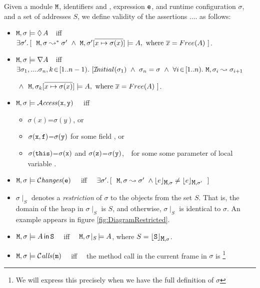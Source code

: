 \documentclass[acmsmall,screen]{acmart}
\begin{document}
\begin{definition}
\label{def:permission}
Given a module ${\mbox{\tt{M}}}$, identifiers  and , expression ${{\mbox{\tt{e}}}}$, and runtime configuration $\sigma$, and a set of addresses $S$,
we define validity of the assertions   .... as follows:

\begin{itemize}
\item
${{\mbox{\tt{M}}}{{{\mbox{\tt{}}}}}},\sigma \models  \lozenge\, A$\ \ iff\ \  $\exists \sigma'.\, [\ \ \M,\sigma \leadsto^* \sigma' \ \wedge \ \M,\sigma' [\overline{x \mapsto \sigma(x)}]\models \A, \mbox{ where } \overline{x}=Free(\A)\   ]$.
\item
${{\mbox{\tt{M}}}{{{\mbox{\tt{}}}}}},\sigma \models  \nabla A$\ \   iff\ \  $\exists \sigma_1,....\sigma_n, k\!\in\![1..n-1).\ [ \Initial {\sigma_1}\  \wedge\ \sigma_n=\sigma\ \wedge\ \forall i\!\in\![1..n).\ \M,\sigma_i\leadsto  \sigma_{i+1}  $\\
\strut \hspace{5.7cm} $\ \wedge \  \ {\mbox{\tt{M}}},\sigma_k[\overline{x \mapsto \sigma(x)}]\models A, \mbox{ where } \overline{x}=Free(A)\  ]$.
\item
${{\mbox{\tt{M}}}{{{\mbox{\tt{}}}}}},\sigma \models   {\mathcal{A}}\textrm{\textit{ccess}}({\mbox{\tt{x}}},{\mbox{\tt{y}}})$   \ \ iff  \begin{itemize}
\item
$\sigma(x)$=$\sigma(y)$, or
\item
$\sigma({\mbox{\tt{x}}},{\mbox{\tt{f}}})$=$\sigma({\mbox{\tt{y}}})$  for some field ,  or
\item
$\sigma({\mbox{\tt{this}}})$=$\sigma({\mbox{\tt{x}}})$ and
  $\sigma({\mbox{\tt{z}}})$=$\sigma({\mbox{\tt{y}}})$,
  $\strut \hspace{0.1cm}$
for some some parameter of local variable .
 \end{itemize}
 \item
 ${{\mbox{\tt{M}}}{{{\mbox{\tt{}}}}}},\sigma \models   \mathcal{C}\textrm{\textit{hanges}}({\mbox{\tt{e}}})$   \ \ iff \  \
 $\exists \sigma'.\, [\ \ \M,\sigma \leadsto \sigma' \ \wedge \interp{e}{\M,\sigma} \neq \interp{e}{\M,\sigma'}\ \ ]$


\item
 $\sigma\!\mid_S$ denotes a {\em restriction} of $\sigma$ to the objects from the set $S$. That is, the domain of
 the heap in $\sigma\mid_S$ is $S$, and otherwise,  $\sigma\mid_S$ is identical to $\sigma$. An example appears in figure \ref{fig:DiagramRestricted}.
 \item
${\mbox{\tt{M}}},\sigma  \models A\,{\bf{\sf {in}}}\, {\mbox{\tt{S}}}$  \  \ iff \ \
  $ {\mbox{\tt{M}}},\sigma\!\mid_S\, \models A $, where   $S={\lfloor{ {{\mbox{\tt{S}}}}}\rfloor_{{\mbox{\tt{M}}},\sigma}} $.
 \item
 ${\mbox{\tt{M}}},\sigma  \models {\mathcal{C}}\textrm{\textit{alls}}({\mbox{\tt{m}}})$ \ \ iff \ \ the method call in the current frame in $\sigma$ is
 \footnote{We will express this precisely  when we have the full definition of $\sigma$}
\end{itemize}
\end{definition}
\end{document}
